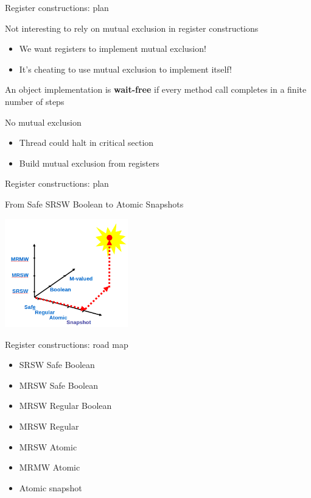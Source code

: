 \begin{frame}{Register constructions: plan}

Not interesting to rely on mutual exclusion in register constructions
\begin{itemize}
  \item We want registers to implement mutual exclusion!
  \item It’s cheating to use mutual exclusion to implement itself!
\end{itemize}

\pause

\begin{definition}
  An object implementation is \textbf{wait-free} if every method call completes in a finite number of steps 
\end{definition} 

\pause

No mutual exclusion
\begin{itemize}
  \item Thread could halt in critical section
  \item Build mutual exclusion from registers
\end{itemize}
\end{frame}

\begin{frame}{Register constructions: plan}

From Safe SRSW Boolean to Atomic Snapshots

\begin{center}
  \includegraphics[width=0.4\textwidth]{./pics/space2.png}
\end{center}

\end{frame}


\begin{frame}{Register constructions: road map}

\begin{itemize}
  \item SRSW Safe Boolean
  \item MRSW Safe Boolean
  \item MRSW Regular Boolean
  \item MRSW Regular
  \item MRSW Atomic
  \item MRMW Atomic
  \item Atomic snapshot
\end{itemize}

\end{frame}


